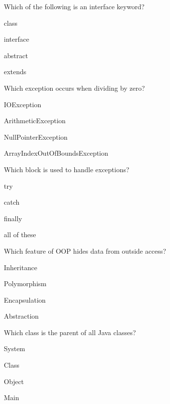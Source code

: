 \documentclass{CWNUExam}
\begin{document}
\begin{question}
Which of the following is an interface keyword?
\paren
\begin{choices}
\item class
\item interface
\item abstract
\item extends
\end{choices}
\end{question}

\begin{question}
Which exception occurs when dividing by zero?
\paren
\begin{choices}
\item IOException
\item ArithmeticException
\item NullPointerException
\item ArrayIndexOutOfBoundsException
\end{choices}
\end{question}

\begin{question}
Which block is used to handle exceptions?
\paren
\begin{choices}
\item try
\item catch
\item finally
\item all of these
\end{choices}
\end{question}

\begin{question}
Which feature of OOP hides data from outside access?
\paren
\begin{choices}
\item Inheritance
\item Polymorphism
\item Encapsulation
\item Abstraction
\end{choices}
\end{question}

\begin{question}
Which class is the parent of all Java classes?
\paren
\begin{choices}
\item System
\item Class
\item Object
\item Main
\end{choices}
\end{question}
\end{document}
